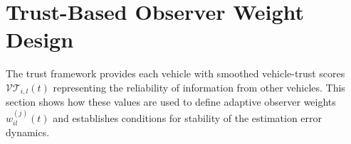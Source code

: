 \documentclass{ifacconf}
\def\VT{\mathcal{VT}} %
\begin{document}


\section{Trust-Based Observer Weight Design}\label{sec_Weigth_Design}
The trust framework provides each vehicle with smoothed vehicle-trust scores $\VT_{i,l}(t)$ representing the reliability of information from other vehicles.
This section shows how these values are used to define adaptive observer weights $w_{il}^{(j)}(t)$ and establishes conditions for stability of the estimation error dynamics.
\end{document}
